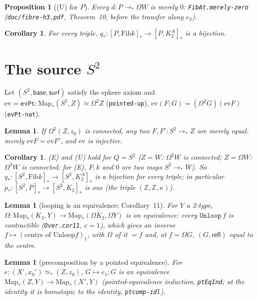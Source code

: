\documentclass[11pt]{amsart}
\newtheorem{proposition}[theorem]{Proposition}
\newtheorem{lemma}[theorem]{Lemma}
\newtheorem{corollary}[theorem]{Corollary}
\theoremstyle{definition}
\theoremstyle{remark}
\newcommand{\Om}{\Omega}
\newcommand{\Map}{\mathrm{Map}_*}
\newcommand{\Z}{\mathbb{Z}}
\newcommand{\code}[1]{\texttt{#1}}
\newcommand{\refl}{\mathsf{refl}}
\newcommand{\hc}[2]{[#1,#2]_*}
\newcommand{\Fib}{\mathrm{Fib}}
\begin{document}
\begin{proposition}[(U) for $P$]\label{p:UP}
Every $d:P\to_*\Om W$ is merely $0$: \code{FibAt.merely-zero}
(\code{doc/fibre-h3.pdf}, Theorem~10, before the transfer along $e_3$).
\end{proposition}

\begin{corollary}\label{c:qP}
For every triple, $q_*:\hc P{\Fib k}\to\hc P{K^A_2}$ is a bijection.
\end{corollary}

\section{The source $S^2$}

Let $(S^2,\mathsf{base},\mathsf{surf})$ satisfy the sphere axiom and
$\mathrm{ev}=\code{evPt}:\Map(S^2,Z)\simeq\Om^2Z$ (\code{pointed-up}),
$\mathrm{ev}(F;G)=(\Om^2G)(\mathrm{ev}F)$ (\code{evPt-nat}).

\begin{lemma}\label{l:s2paths}
If $\Om^2(Z,z_0)$ is connected, any two $F,F':S^2\to_*Z$ are merely
equal: merely $\mathrm{ev}F=\mathrm{ev}F'$, and $\mathrm{ev}$ is
injective.
\end{lemma}

\begin{corollary}\label{c:qS}
(E) and (U) hold for $Q=S^2$ ($Z=W$: $\Om^2W$ is connected;
$Z=\Om W$: $\Om^3W$ is connected; for (E), $F;k$ and $0$ are two maps
$S^2\to_*W$). So $q_*:\hc{S^2}{\Fib k}\to\hc{S^2}{K^A_2}$ is a bijection
for every triple; in particular $p_*:\hc{S^2}P\to\hc{S^2}{K_2}$ is one
(the triple $(\Z,\Z,\kappa)$).
\end{corollary}

\begin{lemma}[looping is an equivalence; Corollary~11]\label{l:loopeq}
For $Y$ a 2-type, $\Om:\Map(K_2,Y)\to\Map(\Om K_2,\Om Y)$ is an
equivalence: every $\code{Unloop}\,f$ is contractible
(\code{Over.cor11}, $c=1$), which gives an inverse
$f\mapsto(\text{centre of Unloop}f)_1$, with $\Om$ of it $=f$ and, at
$f=\Om G$, $(G,\refl)$ equal to the centre.
\end{lemma}

\begin{lemma}[precomposition by a pointed equivalence]\label{l:preeq}
For $e:(X',x_0')\simeq_*(Z,z_0)$, $G\mapsto e_1;G$ is an equivalence
$\Map(Z,Y)\to\Map(X',Y)$ (pointed-equivalence induction,
\code{ptEqInd}; at the identity it is homotopic to the identity,
\code{ptcomp-idl}).
\end{lemma}
\end{document}
